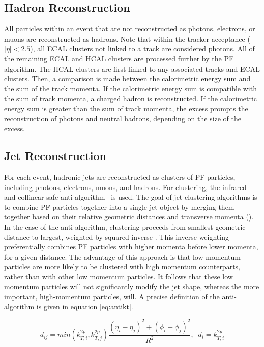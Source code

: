 \subsection{Hadron Reconstruction}
All particles within an event that are not reconstructed as photons, electrons, or muons are reconstructed as hadrons. Note that within the tracker acceptance ($|\eta|<2.5$), all ECAL clusters 
not linked to a track are considered photons. All of the remaining ECAL and HCAL clusters are processed further by the PF algorithm. The HCAL clusters are 
first linked to any associated tracks and ECAL clusters. Then, a comparison is made between the calorimetric energy sum and the sum of the track momenta. If the calorimetric energy sum is 
compatible with the sum of track momenta, a charged hadron is reconstructed. If the calorimetric energy sum is greater than the sum of track momenta, the excess prompts the reconstruction of photons and neutral hadrons, depending on the size of the excess. 

\subsection{Jet Reconstruction}
For each event, hadronic jets are reconstructed as clusters of PF particles, including photons, electrons, muons, and hadrons. For clustering, the infrared and collinear-safe anti-\kt algorithm~\cite{Cacciari:2008gp, Cacciari:2011ma} is used. The goal of jet clustering algorithms is to combine PF particles together into a single jet object by merging them together based on their relative geometric distances and transverse momenta (\kt). In the case of the anti-\kt algorithm, clustering proceeds from smallest geometric distance to largest, weighted by squared inverse \kt. This inverse weighting 
preferentially combines PF particles with higher momenta before lower momenta, for a given distance. The advantage of this approach is that low momentum particles are more likely to be clustered 
with high momentum counterparts, rather than with other low momentum particles. It follows that these low momentum particles will not significantly modify the jet shape, whereas the more important, high-momentum particles, will. A precise definition of the anti-\kt algorithm is given in equation \ref{eq:antikt}. 

\begin{equation}
	d_{ij} = min(k_{T,i}^{2p}, k_{T,j}^{2p})\frac{(\eta_i - \eta_j)^2 + (\phi_i - \phi_j)^2}{R^2},\;\; d_i = k_{T,i}^{2p}
	\label{eq:antikt}
\end{equation}

